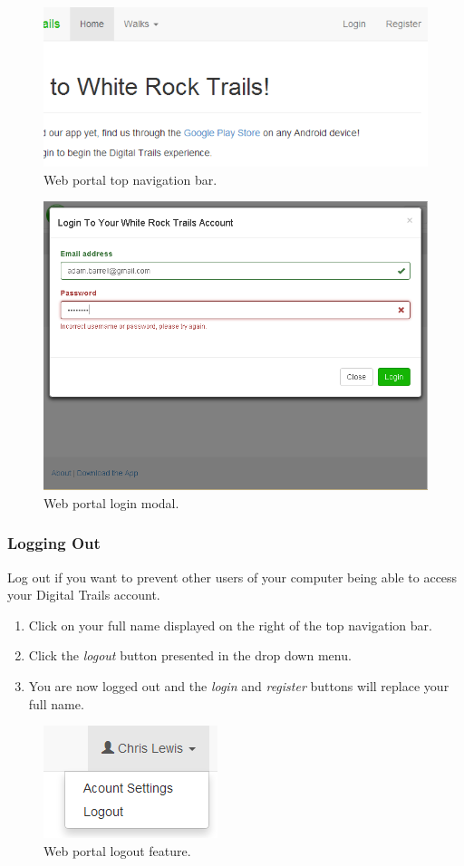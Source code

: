 \documentclass[11pt,a4paper]{report}
\begin{document}
\begin{figure}[H]
\centering
\includegraphics[width=0.7\linewidth]{./img/webportal-guide/login}
\caption{Web portal top navigation bar.}
\label{fig:login-guide}
\end{figure}

\begin{figure}[H]
\centering
\includegraphics[width=0.6\linewidth]{./img/webportal/login}
\caption{Web portal login modal.}
\label{fig:login-modal}
\end{figure}

\subsubsection{Logging Out}

Log out if you want to prevent other users of your computer being able to access your Digital Trails account.

\begin{enumerate}
\item Click on your full name displayed on the right of the top navigation bar.
\item Click the \emph{logout} button presented in the drop down menu.
\item You are now logged out and the \emph{login} and \emph{register} buttons will replace your full name.
\end{enumerate}

\begin{figure}[h]
\centering
\includegraphics[width=0.4\linewidth]{./img/webportal-guide/logout}
\caption{Web portal logout feature.}
\label{fig:logout}
\end{figure}
\end{document}
